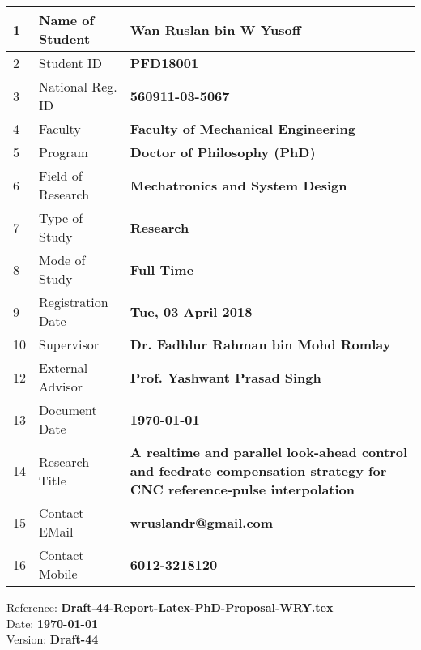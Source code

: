 \begin{titlepage}
\begin{table}[ht]
\begin{center}
\begin{tabular}{ |p{0.5cm}|p{5.4cm}|p{10.0cm}| }
			\hline 1 & Name of Student    & \textbf{Wan Ruslan bin W Yusoff} \\ 
			\hline 2 & Student ID         & \textbf{PFD18001} \\ 
			\hline 3 & National Reg. ID   & \textbf{560911-03-5067} \\ 
			\hline 4 & Faculty            & \textbf{Faculty of Mechanical Engineering} \\ 
			\hline 5 & Program            & \textbf{Doctor of Philosophy (PhD)} \\ 
			\hline 6 & Field of Research  & \textbf{Mechatronics and System Design} \\ 
			\hline 7 & Type of Study      & \textbf{Research}\\ 
			\hline 8 & Mode of Study      & \textbf{Full Time} \\ 
			\hline 9 & Registration Date  & \textbf{Tue, 03 April 2018} \\ 
			\hline 10 & Supervisor         & \textbf{Dr. Fadhlur Rahman bin Mohd Romlay} \\ 
			\hline 12 & External Advisor  & \textbf{Prof. Yashwant Prasad Singh} \\ 
			\hline 13 & Document Date     & \textbf{\today} \\ 
			\hline 14 & Research Title    & \textbf{A realtime and parallel look-ahead control and feedrate compensation strategy for CNC reference-pulse
				 interpolation} \\ 
			\hline 15 & Contact EMail     & \textbf{wruslandr@gmail.com} \\
			\hline 16 & Contact Mobile    & \textbf{6012-3218120} \\
			\hline
		\end{tabular}
		\label{table:PhD Program Registration Details}
	\end{center}
\end{table}  


\vspace{1.0cm}
\begin{flushleft}
{\normalsize	
Reference: \textbf{Draft-44-Report-Latex-PhD-Proposal-WRY.tex}\\
Date: \textbf{\today} \\
Version: \textbf{Draft-44}\\
}

\end{flushleft} 
\end{titlepage}
